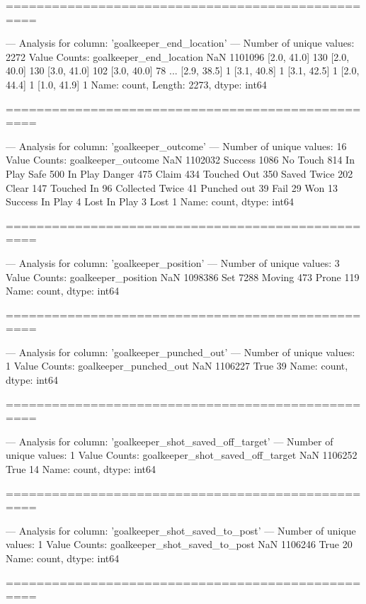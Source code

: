 ==================================================

--- Analysis for column: 'goalkeeper_end_location' ---
Number of unique values: 2272
Value Counts:
goalkeeper_end_location
NaN            1101096
[2.0, 41.0]        130
[2.0, 40.0]        130
[3.0, 41.0]        102
[3.0, 40.0]         78
                ...   
[2.9, 38.5]          1
[3.1, 40.8]          1
[3.1, 42.5]          1
[2.0, 44.4]          1
[1.0, 41.9]          1
Name: count, Length: 2273, dtype: int64

==================================================

--- Analysis for column: 'goalkeeper_outcome' ---
Number of unique values: 16
Value Counts:
goalkeeper_outcome
NaN                1102032
Success               1086
No Touch               814
In Play Safe           500
In Play Danger         475
Claim                  434
Touched Out            350
Saved Twice            202
Clear                  147
Touched In              96
Collected Twice         41
Punched out             39
Fail                    29
Won                     13
Success In Play          4
Lost In Play             3
Lost                     1
Name: count, dtype: int64

==================================================

--- Analysis for column: 'goalkeeper_position' ---
Number of unique values: 3
Value Counts:
goalkeeper_position
NaN       1098386
Set          7288
Moving        473
Prone         119
Name: count, dtype: int64

==================================================

--- Analysis for column: 'goalkeeper_punched_out' ---
Number of unique values: 1
Value Counts:
goalkeeper_punched_out
NaN     1106227
True         39
Name: count, dtype: int64

==================================================

--- Analysis for column: 'goalkeeper_shot_saved_off_target' ---
Number of unique values: 1
Value Counts:
goalkeeper_shot_saved_off_target
NaN     1106252
True         14
Name: count, dtype: int64

==================================================

--- Analysis for column: 'goalkeeper_shot_saved_to_post' ---
Number of unique values: 1
Value Counts:
goalkeeper_shot_saved_to_post
NaN     1106246
True         20
Name: count, dtype: int64

==================================================

